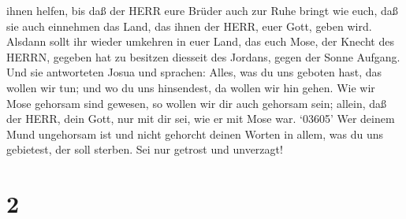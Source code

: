 ihnen helfen,  bis daß der HERR eure Brüder auch zur Ruhe
bringt wie euch, daß sie auch einnehmen das Land, das ihnen der HERR,
euer Gott, geben wird. Alsdann sollt ihr wieder umkehren in euer Land,
das euch Mose, der Knecht des HERRN, gegeben hat zu besitzen diesseit
des Jordans, gegen der Sonne Aufgang.  Und sie antworteten
Josua und sprachen: Alles, was du uns geboten hast, das wollen wir tun;
und wo du uns hinsendest, da wollen wir hin gehen.  Wie wir
Mose gehorsam sind gewesen, so wollen wir dir auch gehorsam sein;
allein, daß der HERR, dein Gott, nur mit dir sei, wie er mit Mose war.
 `03605' Wer deinem Mund ungehorsam ist und nicht gehorcht
deinen Worten in allem, was du uns gebietest, der soll sterben. Sei nur
getrost und unverzagt!

\hypertarget{section-1}{%
\section{2}\label{section-1}}


